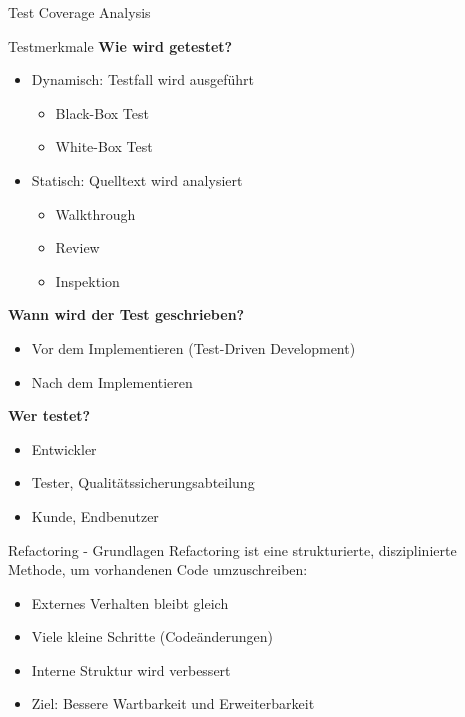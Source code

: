 \begin{example2}{Test Coverage Analysis}
\begin{KR}{Testmerkmale}
\textbf{Wie wird getestet?}
\begin{itemize}
    \item Dynamisch: Testfall wird ausgeführt
    \begin{itemize}
        \item Black-Box Test
        \item White-Box Test
    \end{itemize}
    \item Statisch: Quelltext wird analysiert
    \begin{itemize}
        \item Walkthrough
        \item Review
        \item Inspektion
    \end{itemize}
\end{itemize}

\textbf{Wann wird der Test geschrieben?}
\begin{itemize}
    \item Vor dem Implementieren (Test-Driven Development)
    \item Nach dem Implementieren
\end{itemize}

\textbf{Wer testet?}
\begin{itemize}
    \item Entwickler
    \item Tester, Qualitätssicherungsabteilung
    \item Kunde, Endbenutzer
\end{itemize}
\end{KR}

\begin{concept}{Refactoring - Grundlagen}
Refactoring ist eine strukturierte, disziplinierte Methode, um vorhandenen Code umzuschreiben:
\begin{itemize}
    \item Externes Verhalten bleibt gleich
    \item Viele kleine Schritte (Codeänderungen)
    \item Interne Struktur wird verbessert
    \item Ziel: Bessere Wartbarkeit und Erweiterbarkeit
\end{itemize}
\end{concept}


\end{example2}
